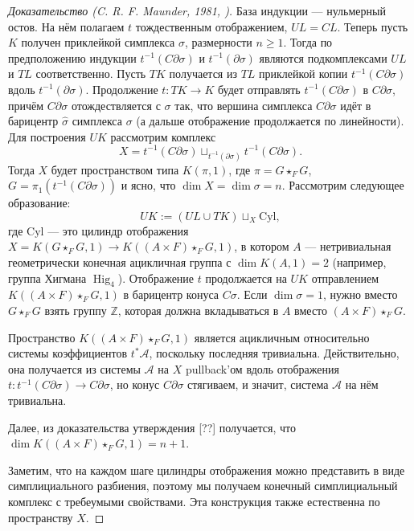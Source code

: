 \documentclass[14pt, dvipsnames]{extarticle}
\theoremstyle{definition}
\theoremstyle{remark}
\DeclareMathOperator{\Hig}{\mathrm{Hig}}
\begin{document}
\begin{proof}[Доказательство {\normalfont (C. R. F. Maunder, 1981, \cite{Maunder})}]
База индукции --- нульмерный остов. На нём полагаем $t$ тождественным отображением, $UL = CL$. Теперь пусть $K$ получен приклейкой симплекса $\sigma$, размерности $n\geqslant 1$. Тогда по предположению индукции $t^{-1}(C\partial\sigma)$ и $t^{-1}(\partial\sigma)$ являются подкомплексами $UL$ и $TL$ соответственно. Пусть $TK$ получается из $TL$ приклейкой копии $t^{-1}(C\partial \sigma)$ вдоль $t^{-1}(\partial\sigma)$. Продолжение $t: TK\to K$ будет отправлять $t^{-1}(C\partial \sigma)$ в $C\partial\sigma$, причём $C\partial\sigma$ отождествляется с $\sigma$ так, что вершина симплекса $C\partial\sigma$ идёт в барицентр $\hat{\sigma}$ симплекса $\sigma$ (а дальше отображение продолжается по линейности). Для построения $UK$ рассмотрим комплекс $$X = t^{-1}(C\partial\sigma)\sqcup_{t^{-1}(\partial\sigma)}t^{-1}(C\partial\sigma).$$ Тогда $X$ будет пространством типа $K(\pi, 1)$, где $\pi = G\star_F G$, $G = \pi_1(t^{-1}(C\partial\sigma))$ и ясно, что $\dim X = \dim \sigma = n$. Рассмотрим следующее образование: $$UK := (UL\cup TK)\sqcup_X \mathrm{Cyl},$$ где $\mathrm{Cyl}$ --- это цилиндр отображения $X = K(G\star_F G, 1)\to K((A\times F)\star_F G, 1)$, в котором $A$ --- нетривиальная геометрически конечная ацикличная группа с $\dim K(A, 1) = 2$ (например, группа Хигмана $\Hig_4$). Отображение $t$ продолжается на $UK$ отправлением $K((A\times F)\star_F G, 1)$ в барицентр конуса $C\sigma$. Если $\dim\sigma = 1$, нужно вместо $G\star_F G$ взять группу $\mathbb{Z}$, которая должна вкладываться в $A$ вместо $(A\times F)\star_F G$.

Пространство $K((A\times F)\star_FG, 1)$ является ацикличным относительно системы коэффициентов $t^\ast\mathcal{A}$, поскольку последняя тривиальна. Действительно, она получается из системы $\mathcal{A}$ на $X$ pullback'ом вдоль отображения $t: t^{-1}(C\partial\sigma)\to C\partial\sigma$, но конус $C\partial\sigma$ стягиваем, и значит, система $\mathcal{A}$ на нём тривиальна. 

Далее, из доказательства утверждения [??] получается, что $\dim K((A\times F)\star_FG, 1) = n + 1$.   

Заметим, что на каждом шаге цилиндры отображения можно представить в виде симплициального разбиения, поэтому мы получаем конечный симплициальный комплекс с требеумыми свойствами. Эта конструкция также естественна по пространству $X$.  


\end{proof}
\end{document}
